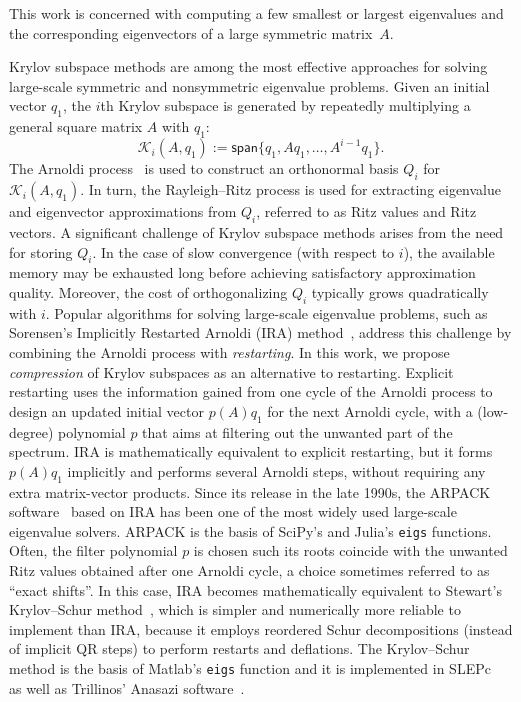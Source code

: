 \documentclass{siamart190516}
\newcommand{\defi}{:=}
\providecommand{\spa}[1]{\mathsf{span}\{#1\}}
\begin{document}
This work is concerned with computing a few smallest or largest eigenvalues and the corresponding eigenvectors of a large symmetric matrix~$A$. 

Krylov subspace methods are among the most effective approaches for solving large-scale symmetric and nonsymmetric eigenvalue problems. Given an initial vector $q_1$, the $i$th Krylov subspace is generated by repeatedly multiplying a general square matrix $A$ with $q_1$:
\begin{equation*}
    \mathcal{K}_{i}(A,q_1) \defi \spa{q_1,Aq_1,\dotsc,A^{i-1}q_1}.
\end{equation*}
The Arnoldi process~\cite[Sec. 10.5]{Golub2013} is used to construct an orthonormal basis $Q_{i}$ for $\mathcal{K}_{i}(A,q_1)$. In turn, the Rayleigh--Ritz process is used for extracting eigenvalue and eigenvector approximations from $Q_i$, referred to as Ritz values and Ritz vectors.
A significant challenge of Krylov subspace methods arises from the need for storing $Q_i$. In the case of slow convergence (with respect to $i$), the available memory  may be exhausted long before achieving satisfactory approximation quality. Moreover, the cost of orthogonalizing $Q_i$ typically grows quadratically with $i$. 
Popular algorithms for solving large-scale eigenvalue problems, such as Sorensen's Implicitly Restarted Arnoldi (IRA) method~\cite{sorensen1992implicit},
address this challenge by combining the Arnoldi process with \emph{restarting}.
In this work, we propose \emph{compression} of Krylov subspaces as an alternative to restarting.
Explicit restarting uses the information gained from one cycle of the Arnoldi process to design an updated initial vector $p(A) q_1$ for the next Arnoldi cycle, with a (low-degree) polynomial $p$ that aims at filtering out the unwanted part of the spectrum. IRA is mathematically equivalent to explicit restarting, but it forms $p(A) q_1$ implicitly and performs several Arnoldi steps, without requiring any extra matrix-vector products.
Since its release in the late 1990s, the ARPACK software~\cite{lehoucq1998arpack} based on IRA has been one of the most widely used large-scale eigenvalue solvers. ARPACK is the basis of 
SciPy's and Julia's {\tt eigs} functions.
Often, the filter polynomial $p$ is chosen such its roots coincide with the unwanted Ritz values obtained after one Arnoldi cycle, a choice sometimes referred to as ``exact shifts''. In this case, IRA becomes mathematically equivalent to Stewart's Krylov--Schur method~\cite{stewart2002krylov}, which is simpler and numerically more reliable to implement than IRA, because it employs reordered Schur decompositions (instead of implicit QR steps) to perform restarts and deflations. The Krylov--Schur method is the basis of Matlab's 
{\tt eigs} function and it is implemented in SLEPc~\cite{hernandez2007parallel}
as well as Trillinos' Anasazi software~\cite{Baker2009}.
\end{document}
